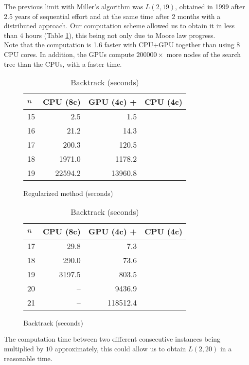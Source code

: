 The previous limit with Miller's algorithm was $L(2,19)$, obtained in 1999 after 2.5 years of sequential effort and at the same time after 2 months with a distributed approach\cite{Mil00}. Our computation scheme allowed us to obtain it in less than 4 hours (Table \ref{tab:result_base_regu}), this being not only due to Moore law progress.\\
Note that the computation is 1.6 faster with CPU+GPU together than using 8 CPU cores. In addition, the GPUs compute $200000\times$ more nodes of the search tree than the CPUs, with a faster time.

\begin{table}[t!]
\begin{subfigure}[b]{0.5\linewidth}
\centering
\begin{tabular}{l r r r}
					\hline
					$n$ & CPU (8c) &  GPU (4c) +  &  \hspace*{-.8em}CPU (4c) \\
					\hline
					\hline
					15	& 2.5 & 1.5 & \\
					16  & 21.2 &14.3 & \\
					17  & 200.3 &120.5 &\\
					18  & 1971.0 &1178.2 &\\
					19  & 22594.2 & 13960.8 & \\ 
					\hline
\end{tabular}
\caption{Regularized method (seconds)}
\label{tab:result_base_regu}
\end{subfigure}
\begin{subfigure}[b]{0.5\linewidth}
\centering
\begin{tabular}{ l r r r }
					\hline
					$n$ & CPU (8c) &  GPU (4c) +  &  \hspace*{-.8em}CPU (4c) \\
					\hline
					\hline
					17  & 29.8 & 7.3&\\
					18  & 290.0 & 73.6&\\
					19  & 3197.5 & 803.5& \\
					20  & -- & 9436.9 &\\
					21  & -- & 118512.4& \\ 
					\hline
\end{tabular}	
\caption{Backtrack  (seconds)}
\label{tab:result_backtrack}
\end{subfigure}
\end{table}

The computation time between two different consecutive instances being multiplied by $10$ approximately, this could allow us to obtain $L(2,20)$ in a reasonable time.


